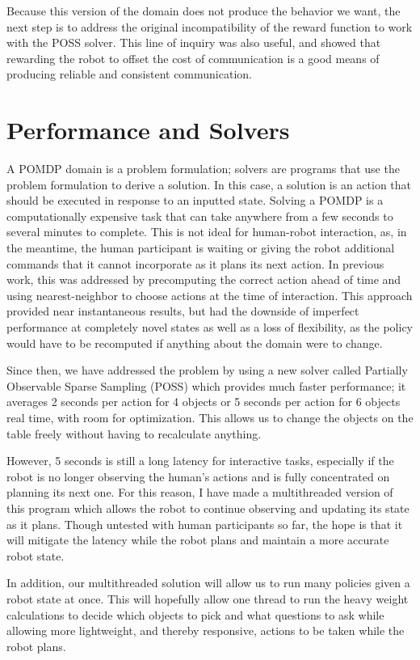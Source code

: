 \documentclass{article}
\begin{document}
Because this version of the domain does not produce the behavior we want, the next step is to address the original incompatibility of the reward function to work with the POSS solver. This line of inquiry was also useful, and showed that rewarding the robot to offset the cost of communication is a good means of producing reliable and consistent communication. 


\section{Performance and Solvers}


A POMDP domain is a problem formulation; solvers are programs that use the problem formulation to derive a solution. In this case, a solution is an action that should be executed in response to an inputted state. Solving a POMDP is a computationally expensive task that can take anywhere from a few seconds to several minutes to complete. This is not ideal for human-robot interaction, as, in the meantime, the human participant is waiting or giving the robot additional commands that it cannot incorporate as it plans its next action. In previous work, this was addressed by precomputing the correct action ahead of time and using nearest-neighbor to choose actions at the time of interaction. This approach provided near instantaneous results, but had the downside of imperfect performance at completely novel states as well as a loss of flexibility, as the policy would have to be recomputed if anything about the domain were to change. 

Since then, we have addressed the problem by using a new solver called Partially Observable Sparse Sampling (POSS) which provides much faster performance; it averages 2 seconds per action for 4 objects or 5 seconds per action for 6 objects real time, with room for optimization. This allows us to change the objects on the table freely without having to recalculate anything. 

However, 5 seconds is still a long latency for interactive tasks, especially if the robot is no longer observing the human's actions and is fully concentrated on planning its next one. For this reason, I have made a multithreaded version of this program which allows the robot to continue observing and updating its state as it plans. Though untested with human participants so far, the hope is that it will mitigate the latency while the robot plans and maintain a more accurate robot state. 


In addition, our multithreaded solution will allow us to run many policies given a robot state at once. This will hopefully allow one thread to run the heavy weight calculations to decide which objects to pick and what questions to ask while allowing more lightweight, and thereby responsive, actions to be taken while the robot plans. 
\end{document}

